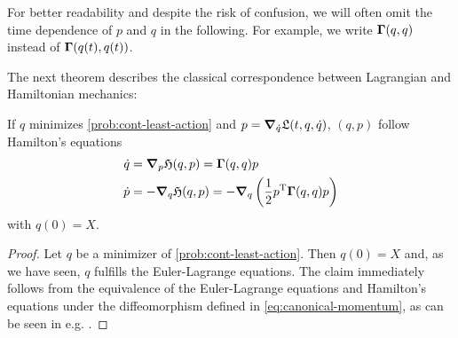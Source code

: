 For better readability and despite the risk of confusion, we will often omit the time dependence of $p$ and $q$ in the following.
For example, we write $\mathbf{\Gamma}(q, q)$ instead of $\mathbf{\Gamma}(q(t), q(t))$.

The next theorem describes the classical correspondence between Lagrangian and Hamiltonian mechanics:
\newline
\begin{theorem}
	\label{theo:hamiltonian-dynamic}
	If $q$ minimizes \cref{prob:cont-least-action} and $p = \grad_{\dot{q}} \mathfrak{L}(t, q, \dot{q})$, $(q, p)$ follow Hamilton's equations
	\begin{equation}
	\label{eq:hamiltonian-system}
		\begin{split}
			\dot{q} &= \grad_p \mathfrak{H}(q, p) = \mathbf{\Gamma}(q, q) p\\
			\dot{p} &= -\grad_q \mathfrak{H}(q, p)
			= -\grad_q \left(\frac{1}{2} p^\mathrm{T} \mathbf{\Gamma}(q, q) p\right)
		\end{split}
	\end{equation}
	with $q(0) = X$.
\end{theorem}
\begin{proof}
	Let $q$ be a minimizer of \cref{prob:cont-least-action}.
	Then $q(0) = X$ and, as we have seen, $q$ fulfills the Euler-Lagrange equations.
	The claim immediately follows from the equivalence of the Euler-Lagrange equations and Hamilton's equations under the diffeomorphism defined in \cref{eq:canonical-momentum}, as can be seen in e.g. \cite{marsden10, goldstein01}.
\end{proof}

